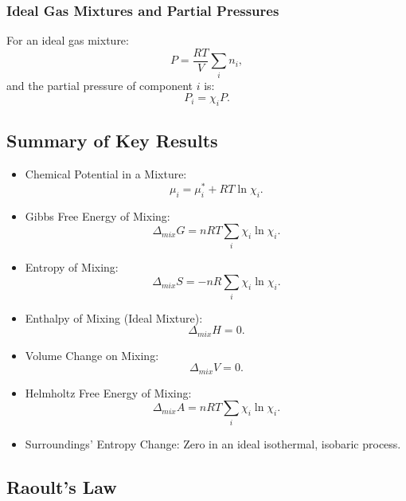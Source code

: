 \documentclass{article}
\theoremstyle{definition}
\begin{document}
\subsubsection{Ideal Gas Mixtures and Partial Pressures}
For an ideal gas mixture:
\begin{equation}
P = \frac{RT}{V}\sum_i n_i,
\end{equation}
and the partial pressure of component \(i\) is:
\begin{equation}
P_i = \chi_i P.
\end{equation}

\subsection{Summary of Key Results}
\begin{itemize}
    \item Chemical Potential in a Mixture:
    \begin{equation}
    \mu_i = \mu_i^* + RT\ln{\chi_i}.
    \end{equation}
    \item Gibbs Free Energy of Mixing:
    \begin{equation}
    \Delta_{mix} G = nRT\sum_i \chi_i\ln{\chi_i}.
    \end{equation}
    \item Entropy of Mixing:
    \begin{equation}
    \Delta_{mix} S = -nR\sum_i \chi_i\ln{\chi_i}.
    \end{equation}
    \item Enthalpy of Mixing (Ideal Mixture):
    \begin{equation}
    \Delta_{mix} H = 0.
    \end{equation}
    \item Volume Change on Mixing:
    \begin{equation}
    \Delta_{mix} V = 0.
    \end{equation}
    \item Helmholtz Free Energy of Mixing:
    \begin{equation}
    \Delta_{mix} A = nRT\sum_i \chi_i\ln{\chi_i}.
    \end{equation}
    \item Surroundings’ Entropy Change: Zero in an ideal isothermal, isobaric process.
\end{itemize}



\subsection{Raoult's Law}
\end{document}
